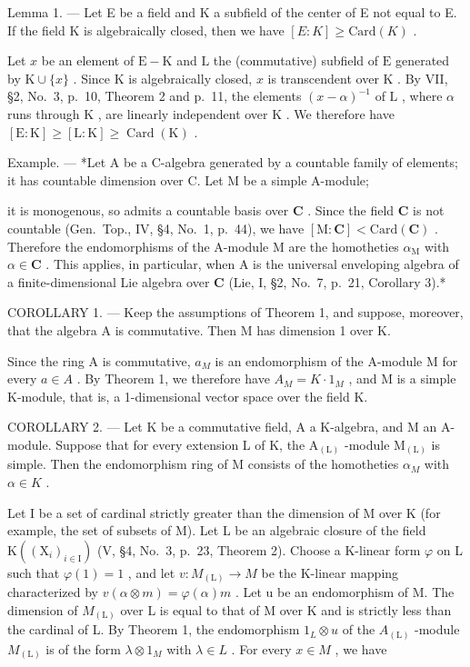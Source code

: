 Lemma 1. --- Let E be a field and K a subfield of the center of E not equal to E. If the field K is algebraically closed, then we have \([E:K] \geqslant \text{Card}(K)\) .

Let \(x\) be an element of \(\mathrm{E} - \mathrm{K}\) and \(\mathrm{L}\) the (commutative) subfield of \(\mathrm{E}\) generated by \(\mathrm{K} \cup \{x\}\) . Since \(\mathrm{K}\) is algebraically closed, \(x\) is transcendent over \(\mathrm{K}\) . By VII, §2, No.~3, p.~10, Theorem 2 and p.~11, the elements \((x - \alpha)^{-1}\) of \(\mathrm{L}\) , where \(\alpha\) runs through \(\mathrm{K}\) , are linearly independent over \(\mathrm{K}\) . We therefore have \([\mathrm{E} : \mathrm{K}] \geqslant [\mathrm{L} : \mathrm{K}] \geqslant \operatorname{Card}(\mathrm{K})\) .

Example. --- *Let A be a C-algebra generated by a countable family of elements; it has countable dimension over C. Let M be a simple A-module;

it is monogenous, so admits a countable basis over \(\mathbf{C}\) . Since the field \(\mathbf{C}\) is not countable (Gen.~Top., IV, §4, No.~1, p.~44), we have \([\mathrm{M}:\mathbf{C}] < \mathrm{Card}(\mathbf{C})\) . Therefore the endomorphisms of the A-module M are the homotheties \(\alpha_{\mathrm{M}}\) with \(\alpha \in \mathbf{C}\) . This applies, in particular, when A is the universal enveloping algebra of a finite-dimensional Lie algebra over \(\mathbf{C}\) (Lie, I, §2, No.~7, p.~21, Corollary 3).*

COROLLARY 1. --- Keep the assumptions of Theorem 1, and suppose, moreover, that the algebra A is commutative. Then M has dimension 1 over K.

Since the ring A is commutative, \(a_{M}\) is an endomorphism of the A-module M for every \(a \in A\) . By Theorem 1, we therefore have \(A_{M} = K \cdot 1_{M}\) , and M is a simple K-module, that is, a 1-dimensional vector space over the field K.

COROLLARY 2. --- Let K be a commutative field, A a K-algebra, and M an A-module. Suppose that for every extension L of K, the \(\mathrm{A}_{(\mathrm{L})}\) -module \(\mathrm{M}_{(\mathrm{L})}\) is simple. Then the endomorphism ring of M consists of the homotheties \(\alpha_{M}\) with \(\alpha \in K\) .

Let I be a set of cardinal strictly greater than the dimension of M over K (for example, the set of subsets of M). Let L be an algebraic closure of the field \(\mathrm{K}((\mathrm{X}_{i})_{i\in\mathrm{I}})\) (V, §4, No.~3, p.~23, Theorem 2). Choose a K-linear form \(\varphi\) on L such that \(\varphi(1)=1\) , and let \(v:M_{(\mathrm{L})}\to M\) be the K-linear mapping characterized by \(v(\alpha\otimes m)=\varphi(\alpha)m\) . Let u be an endomorphism of M. The dimension of \(M_{(\mathrm{L})}\) over L is equal to that of M over K and is strictly less than the cardinal of L. By Theorem 1, the endomorphism \(1_{L}\otimes u\) of the \(A_{(\mathrm{L})}\) -module \(M_{(\mathrm{L})}\) is of the form \(\lambda\otimes1_{M}\) with \(\lambda\in L\) . For every \(x\in M\) , we have

